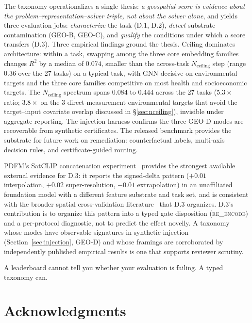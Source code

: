 \documentclass{article}
\begin{document}
The taxonomy operationalizes a single thesis: \emph{a geospatial score is evidence about the problem--representation--solver triple, not about the solver alone}, and yields three evaluation jobs: \emph{characterize} the task (D.1, D.2), \emph{detect} substrate contamination (GEO-B, GEO-C), and \emph{qualify} the conditions under which a score transfers (D.3). Three empirical findings ground the thesis. Ceiling dominates architecture: within a task, swapping among the three core embedding families changes $R^2$ by a median of $0.074$, smaller than the across-task $N_{\text{ceiling}}$ step (range $0.36$ over the 27 tasks) on a typical task, with GNN decisive on environmental targets and the three core families competitive on most health and socioeconomic targets. The $N_{\text{ceiling}}$ spectrum spans $0.084$ to $0.444$ across the 27 tasks ($5.3{\times}$ ratio; $3.8{\times}$ on the 3 direct-measurement environmental targets that avoid the target--input covariate overlap discussed in \S\ref{sec:nceiling}), invisible under aggregate reporting. The injection harness confirms the three GEO-D modes are recoverable from synthetic certificates. The released benchmark provides the substrate for future work on remediation: counterfactual labels, multi-axis decision rules, and certificate-guided routing.

PDFM's SatCLIP concatenation experiment~\citep[Table~4]{agarwal2025pdfm} provides the strongest available external evidence for D.3: it reports the signed-delta pattern (${+}0.01$ interpolation, ${+}0.02$ super-resolution, ${-}0.01$ extrapolation) in an unaffiliated foundation model with a different feature substrate and task set, and is consistent with the broader spatial cross-validation literature~\citep{roberts2017cv,ploton2020spatial,mila2022nndm} that D.3 organizes. D.3's contribution is to organize this pattern into a typed gate disposition (\textsc{re\_encode}) and a per-protocol diagnostic, not to predict the effect novelly. A taxonomy whose modes have observable signatures in synthetic injection (Section~\ref{sec:injection}, GEO-D) and whose framings are corroborated by independently published empirical results is one that supports reviewer scrutiny.

A leaderboard cannot tell you whether your evaluation is failing. A typed taxonomy can.

\section*{Acknowledgments}
\end{document}
